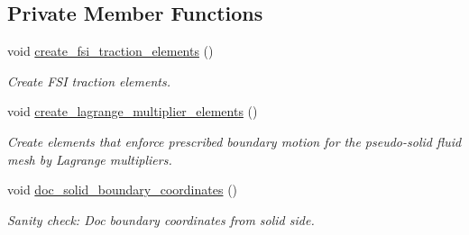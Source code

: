 \subsection*{Private Member Functions}
\begin{DoxyCompactItemize}
\item 
void \hyperlink{classUnstructuredFSIProblem_a934a587c99668fca969a72814b3142a7}{create\+\_\+fsi\+\_\+traction\+\_\+elements} ()
\begin{DoxyCompactList}\small\item\em Create F\+SI traction elements. \end{DoxyCompactList}\item 
void \hyperlink{classUnstructuredFSIProblem_a6f810c300f373cfc79e23d58f95944e3}{create\+\_\+lagrange\+\_\+multiplier\+\_\+elements} ()
\begin{DoxyCompactList}\small\item\em Create elements that enforce prescribed boundary motion for the pseudo-\/solid fluid mesh by Lagrange multipliers. \end{DoxyCompactList}\item 
void \hyperlink{classUnstructuredFSIProblem_a6b86e58ba6cf2871a8e049dd91f6b8b9}{doc\+\_\+solid\+\_\+boundary\+\_\+coordinates} ()
\begin{DoxyCompactList}\small\item\em Sanity check\+: Doc boundary coordinates from solid side. \end{DoxyCompactList}\end{DoxyCompactItemize}

